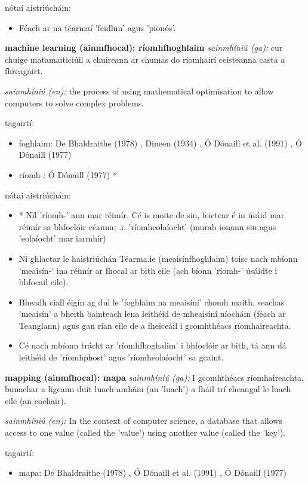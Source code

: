 \documentclass{article}
\begin{document}
nótaí aistriúcháin:
\begin{itemize}
	\item Féach ar na téarmaí 'feidhm' agus 'pionós'.
\end{itemize}


\textbf{machine learning (ainmfhocal): ríomhfhoghlaim}
\textit{sainmhíniú (ga):} cur chuige matamaiticiúil a chuireann ar chumas do ríomhairí ceisteanna casta a fhreagairt.

\textit{sainmhíniú (en):} the process of using mathematical optimisation to allow computers to solve complex problems.

tagairtí:
\begin{itemize}
	\item foghlaim: De Bhaldraithe (1978) \cite{de-bhaldraithe}, Dineen (1934) \cite{dineen}, Ó Dónaill et al. (1991) \cite{focloir-beag}, Ó Dónaill (1977) \cite{odonaill}
	\item ríomh-: Ó Dónaill (1977) \cite{odonaill}*
\end{itemize}

nótaí aistriúcháin:
\begin{itemize}
	\item * Níl 'ríomh-' ann mar réimír. Cé is moite de sin, feictear é in úsáid mar réimír sa bhfoclóir céanna; .i. 'ríomheolaíocht' (murab ionann sin agus 'eolaíocht' mar iarmhír)
	\item Ní ghlactar le haistriúchán Téarma.ie (meaisínfhoghlaim) toisc nach mbíonn 'meaisín-' ina réimír ar fhocal ar bith eile (ach bíonn 'ríomh-' úsáidte i bhfocail eile).
	\item Bheadh ciall éigin ag dul le 'foghlaim na meaisíní' chomh maith, seachas 'meaisín' a bheith bainteach lena leithéid de mheaisíní níocháin (féach ar Teanglann) agus gan rian eile de a fheiceáil i gcomhthéacs ríomhaireachta.
	\item Cé nach mbíonn trácht ar 'ríomhfhoghalim' i bhfoclóir ar bith, tá ann dá leithéid de 'ríomhphost' agus 'ríomheolaíocht' sa gcaint.
\end{itemize}


\textbf{mapping (ainmfhocal): mapa}
\textit{sainmhíniú (ga):} I gcomhthéacs ríomhaireachta, bunachar a ligeann duit luach amháin (an 'luach') a fháil trí cheangal le luach eile (an eochair).

\textit{sainmhíniú (en):} In the context of computer science, a database that allows access to one value (called the 'value') using another value (called the 'key').

tagairtí:
\begin{itemize}
	\item mapa: De Bhaldraithe (1978) \cite{de-bhaldraithe}, Ó Dónaill et al. (1991) \cite{focloir-beag}, Ó Dónaill (1977) \cite{odonaill}
\end{itemize}
\end{document}
